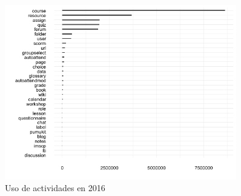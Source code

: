 \begin{figure}[H]
\centering
\includegraphics[width=0.9\textwidth]{../r/usoactividades_2016}
\caption{Uso de actividades en 2016}
\label{fig:usoactividades_2016}
\end{figure}

